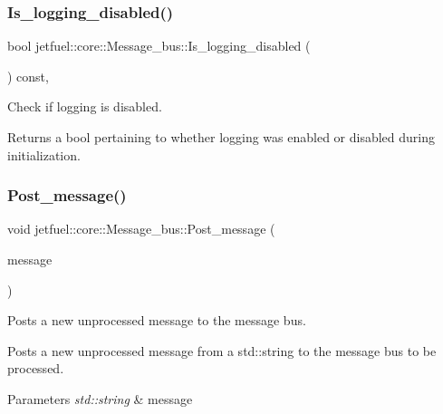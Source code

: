 \subsubsection{\texorpdfstring{Is\+\_\+logging\+\_\+disabled()}{Is\_logging\_disabled()}}
{\footnotesize\ttfamily bool jetfuel\+::core\+::\+Message\+\_\+bus\+::\+Is\+\_\+logging\+\_\+disabled (\begin{DoxyParamCaption}{ }\end{DoxyParamCaption}) const\hspace{0.3cm}{\ttfamily [inline]}, {\ttfamily [protected]}}



Check if logging is disabled. 

Returns a bool pertaining to whether logging was enabled or disabled during initialization. \mbox{\label{classjetfuel_1_1core_1_1Message__bus_a7a36c1ebc19327ddb554d6f8199a6965}} 
\subsubsection{\texorpdfstring{Post\+\_\+message()}{Post\_message()}}
{\footnotesize\ttfamily void jetfuel\+::core\+::\+Message\+\_\+bus\+::\+Post\+\_\+message (\begin{DoxyParamCaption}\item[{const std\+::string}]{message }\end{DoxyParamCaption})}



Posts a new unprocessed message to the message bus. 

Posts a new unprocessed message from a std\+::string to the message bus to be processed.


\begin{DoxyParams}{Parameters}
{\em std\+::string} & message \\
\hline
\end{DoxyParams}
\mbox{\label{classjetfuel_1_1core_1_1Message__bus_a76c25f2b2e8aa7a9cf523b1965dd9953}} 

